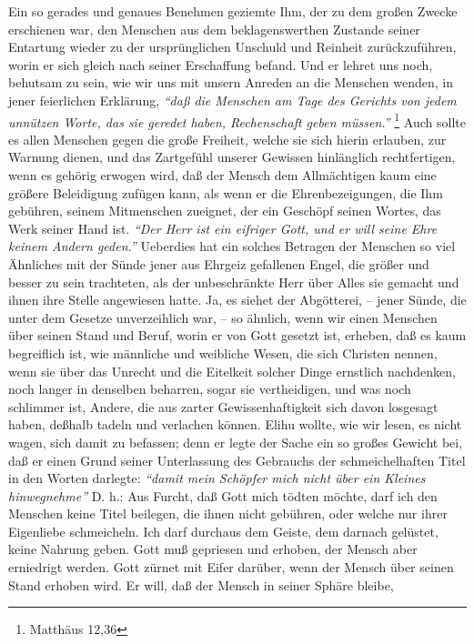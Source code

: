 Ein so gerades und genaues Benehmen geziemte Ihm, der zu dem großen Zwecke
erschienen war, den Menschen aus dem beklagenswerthen Zustande seiner Entartung
wieder zu der ursprünglichen Unschuld und Reinheit zurückzuführen, worin er sich
gleich nach seiner Erschaffung befand. Und er lehret uns noch, behutsam zu sein,
wie wir uns mit unsern Anreden an die Menschen wenden, in jener feierlichen
Erklärung,
\textit{"`daß die Menschen am Tage des Gerichts von jedem unnützen Worte, das
sie geredet haben, Rechenschaft geben müssen."'}
\footnote{Matthäus 12,36}
Auch sollte es allen Menschen gegen die große Freiheit, welche sie sich hierin
erlauben, zur Warnung dienen, und das Zartgefühl unserer Gewissen hinlänglich
rechtfertigen, wenn es gehörig erwogen wird, daß der Mensch dem Allmächtigen
kaum eine größere Beleidigung zufügen kann, als wenn er die Ehrenbezeigungen,
die Ihm gebühren, seinem Mitmenschen zueignet, der ein Geschöpf seinen Wortes,
das Werk seiner Hand ist.
\textit{"`Der Herr ist ein eifriger Gott, und er will seine
Ehre keinem Andern geden."'} Ueberdies hat ein solches Betragen der Menschen so
viel Ähnliches mit der Sünde jener aus Ehrgeiz gefallenen Engel, die größer und
besser zu sein trachteten, als der unbeschränkte Herr über Alles sie gemacht und
ihnen ihre Stelle angewiesen hatte. Ja, es siehet der Abgötterei, -- jener
Sünde,
die unter dem Gesetze unverzeihlich war, -- so ähnlich, wenn wir einen Menschen
über seinen Stand und Beruf, worin er von Gott gesetzt ist, erheben, daß es kaum
begreiflich ist, wie männliche und weibliche Wesen, die sich Christen nennen,
wenn sie über das Unrecht und die Eitelkeit solcher Dinge ernstlich nachdenken,
noch langer in denselben beharren, sogar sie vertheidigen, und was noch
schlimmer ist, Andere, die aus zarter Gewissenhaftigkeit sich davon losgesagt
haben, deßhalb tadeln und verlachen können. Elihu wollte, wie wir lesen, es
nicht wagen, sich damit zu befassen; denn er legte der Sache ein so großes
Gewicht bei, daß er einen Grund seiner Unterlassung des Gebrauchs der
schmeichelhaften Titel in den Worten darlegte:
\textit{"`damit mein Schöpfer mich nicht
über ein Kleines hinwegnehme"'} D. h.: Aus Furcht, daß Gott mich tödten möchte,
darf ich den Menschen keine Titel beilegen, die ihnen nicht gebühren, oder
welche nur ihrer Eigenliebe schmeicheln. Ich darf durchaus dem Geiste, dem
darnach gelüstet, keine Nahrung geben. Gott muß gepriesen und erhoben, der
Mensch aber erniedrigt werden. Gott zürnet mit Eifer darüber,
wenn der Mensch
über seinen Stand erhoben wird. Er will, daß der Mensch in seiner Sphäre bleibe,
